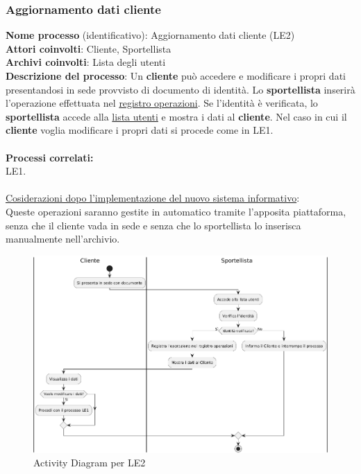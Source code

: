 \documentclass[a4paper,12pt]{article}
\begin{document}
\subsubsection{Aggiornamento dati cliente}
\textbf{Nome processo} (identificativo): Aggiornamento dati cliente (LE2) \\
\textbf{Attori coinvolti}: Cliente, Sportellista \\
\textbf{Archivi coinvolti}: Lista degli utenti \\ 
\textbf{Descrizione del processo}:  Un \textbf{cliente} può accedere e modificare i propri dati presentandosi in sede provvisto di documento di identità.
Lo \textbf{sportellista} inserirà l'operazione effettuata nel \underline{registro operazioni}.
Se l'identità è verificata, lo \textbf{sportellista} accede alla \underline{lista utenti} e mostra i dati al \textbf{cliente}.
Nel caso in cui il \textbf{cliente} voglia modificare i propri dati si procede come in LE1.\\ \\
\textbf{Processi correlati:}\\LE1.\\ \\
\underline{Cosiderazioni dopo l'implementazione del nuovo sistema informativo}: \\ Queste operazioni saranno gestite in automatico tramite l'apposita piattaforma, 
senza che il cliente vada in sede e senza che lo sportellista lo inserisca manualmente nell'archivio.
\begin{figure}[H]
  \centering
  \includegraphics[width=0.8\linewidth]{assets/activitydiagram_LE2.png}
	\caption{Activity Diagram per LE2}
\end{figure}
\end{document}
